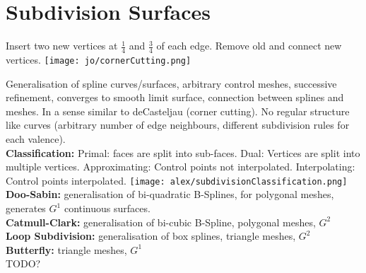 \section{Subdivision Surfaces}

 Insert two new vertices at $\frac{1}{4}$ and $\frac{3}{4}$ of each edge. Remove old and connect new vertices.
\texttt{[image: jo/cornerCutting.png]}

 Generalisation of spline curves/surfaces, arbitrary control meshes, successive refinement, converges to smooth limit surface, connection between splines and meshes. In a sense similar to deCasteljau (corner cutting). No regular structure like curves (arbitrary number of edge neighbours, different subdivision rules for each valence). \\
\textbf{Classification:} Primal: faces are split into sub-faces. Dual: Vertices are split into multiple vertices. Approximating: Control points not interpolated. Interpolating: Control points interpolated.
\texttt{[image: alex/subdivisionClassification.png]}
\textbf{Doo-Sabin:} generalisation of bi-quadratic B-Splines, for polygonal meshes, generates $G^1$ continuous surfaces.\\
\textbf{Catmull-Clark:} generalisation of bi-cubic B-Spline, polygonal meshes, $G^2$\\
\textbf{Loop Subdivision:} generalisation of box splines, triangle meshes, $G^2$\\
\textbf{Butterfly:} triangle meshes, $G^1$\\

 TODO?

